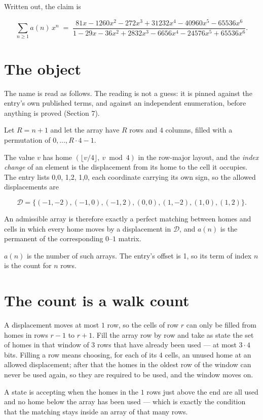 \documentclass[11pt]{article}
\theoremstyle{definition}
\begin{document}
Written out, the claim is

\[\sum_{n \ge 1} a(n)\,x^n \;=\; \frac{81x - 1260x^{2} - 272x^{3} + 31232x^{4} - 40960x^{5} - 65536x^{6}}{1 - 29x - 36x^{2} + 2832x^{3} - 6656x^{4} - 24576x^{5} + 65536x^{6}}.\]

\section{The object}

The name is read as follows. The reading is not a guess: it is pinned against the entry's own published terms, and against an independent enumeration, before anything is proved (Section 7).

Let $R = n + 1$ and let the array have $R$ rows and $4$ columns, filled with a permutation of $0,\dots,R\cdot4-1$.

The value $v$ has home $(\lfloor v/4\rfloor,\ v \bmod 4)$ in the row-major layout, and the {\itshape index change} of an element is the displacement from its home to the cell it occupies. The entry lists 0,0, 1,2, 1,0, each coordinate carrying its own sign, so the allowed displacements are

\[\mathcal{D} = \{(-1,-2), (-1,0), (-1,2), (0,0), (1,-2), (1,0), (1,2)\}.\]

An admissible array is therefore exactly a perfect matching between homes and cells in which every home moves by a displacement in $\mathcal{D}$, and $a(n)$ is the permanent of the corresponding $0$--$1$ matrix.

$a(n)$ is the number of such arrays. The entry's offset is 1, so its term of index $n$ is the count for $n$ rows.

\section{The count is a walk count}

A displacement moves at most $1$ row, so the cells of row $r$ can only be filled from homes in rows $r-1$ to $r+1$. Fill the array row by row and take as state the set of homes in that window of $3$ rows that have already been used --- at most $3\cdot4$ bits. Filling a row means choosing, for each of its $4$ cells, an unused home at an allowed displacement; after that the homes in the oldest row of the window can never be used again, so they are required to be used, and the window moves on.

A state is accepting when the homes in the $1$ rows just above the end are all used and no home below the array has been used --- which is exactly the condition that the matching stays inside an array of that many rows.
\end{document}

